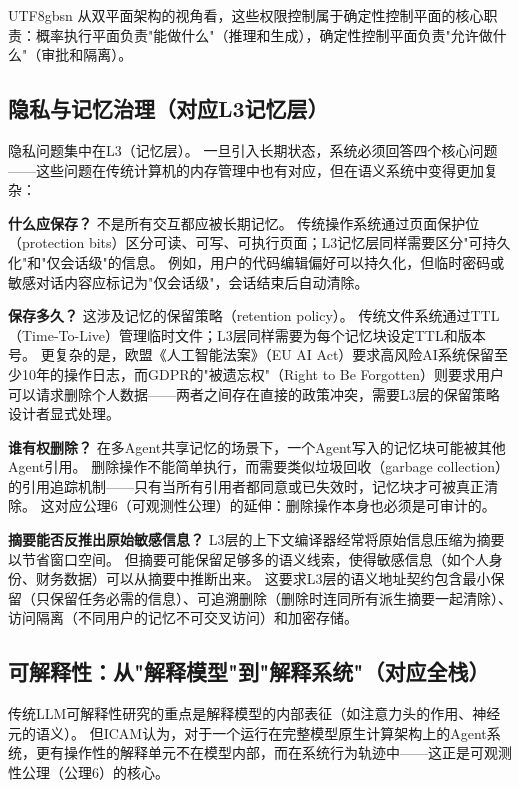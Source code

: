 \documentclass[11pt,a4paper]{article}
\begin{document}
\begin{CJK*}{UTF8}{gbsn}
从双平面架构的视角看，这些权限控制属于确定性控制平面的核心职责：概率执行平面负责"能做什么"（推理和生成），确定性控制平面负责"允许做什么"（审批和隔离）。

\subsection{隐私与记忆治理（对应L3记忆层）}

隐私问题集中在L3（记忆层）。
一旦引入长期状态，系统必须回答四个核心问题——这些问题在传统计算机的内存管理中也有对应，但在语义系统中变得更加复杂：

\textbf{什么应保存？}
不是所有交互都应被长期记忆。
传统操作系统通过页面保护位（protection bits）区分可读、可写、可执行页面；L3记忆层同样需要区分"可持久化"和"仅会话级"的信息。
例如，用户的代码编辑偏好可以持久化，但临时密码或敏感对话内容应标记为"仅会话级"，会话结束后自动清除。

\textbf{保存多久？}
这涉及记忆的保留策略（retention policy）。
传统文件系统通过TTL（Time-To-Live）管理临时文件；L3层同样需要为每个记忆块设定TTL和版本号。
更复杂的是，欧盟《人工智能法案》（EU AI Act）要求高风险AI系统保留至少10年的操作日志\cite{euaiact2026}，而GDPR的"被遗忘权"（Right to Be Forgotten）则要求用户可以请求删除个人数据\cite{gdpr_righttoforget}——两者之间存在直接的政策冲突，需要L3层的保留策略设计者显式处理。

\textbf{谁有权删除？}
在多Agent共享记忆的场景下，一个Agent写入的记忆块可能被其他Agent引用。
删除操作不能简单执行，而需要类似垃圾回收（garbage collection）的引用追踪机制——只有当所有引用者都同意或已失效时，记忆块才可被真正清除。
这对应公理6（可观测性公理）的延伸：删除操作本身也必须是可审计的。

\textbf{摘要能否反推出原始敏感信息？}
L3层的上下文编译器经常将原始信息压缩为摘要以节省窗口空间。
但摘要可能保留足够多的语义线索，使得敏感信息（如个人身份、财务数据）可以从摘要中推断出来。
这要求L3层的语义地址契约包含最小保留（只保留任务必需的信息）、可追溯删除（删除时连同所有派生摘要一起清除）、访问隔离（不同用户的记忆不可交叉访问）和加密存储\cite{longmemeval2024,navaie2025privacy}。

\subsection{可解释性：从"解释模型"到"解释系统"（对应全栈）}

传统LLM可解释性研究的重点是解释模型的内部表征（如注意力头的作用、神经元的语义）。
但ICAM认为，对于一个运行在完整模型原生计算架构上的Agent系统，更有操作性的解释单元不在模型内部，而在系统行为轨迹中——这正是可观测性公理（公理6）的核心。


\end{CJK*}
\end{document}
